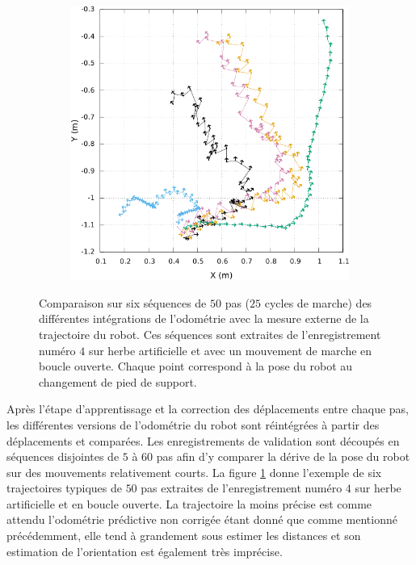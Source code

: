 \begin{figure}[htbp]
\begin{subfigure}{0.29\paperwidth}
    \end{subfigure}
    \begin{subfigure}{0.29\paperwidth}
        \centering
        \includegraphics[type=pdf,ext=.pdf,read=.pdf,width=1.0\linewidth]{../plot/OdometryLWPR/grass_open_traj6_pose}
    \end{subfigure}
    \caption{\label{fig:odometry_lwpr_trajs} 
        Comparaison sur six séquences de $50$ pas ($25$ cycles de marche) des différentes intégrations
        de l'odométrie avec la mesure externe de la trajectoire du robot.
        Ces séquences sont extraites de l'enregistrement numéro $4$ sur herbe artificielle et 
        avec un mouvement de marche en boucle ouverte. 
        Chaque point correspond à la pose du robot au changement de pied de support.
    }
\end{figure}

Après l'étape d'apprentissage et la correction des déplacements entre chaque pas, les différentes 
versions de l'odométrie du robot sont réintégrées à partir des déplacements et comparées.
Les enregistrements de validation sont découpés en séquences disjointes de $5$ à $60$ pas afin
d'y comparer la dérive de la pose du robot sur des mouvements relativement courts.
La figure \ref{fig:odometry_lwpr_trajs} donne l'exemple de six trajectoires typiques de $50$ pas
extraites de l'enregistrement numéro $4$ sur herbe artificielle et en boucle ouverte.
La trajectoire la moins précise est comme attendu l'odométrie prédictive non corrigée
étant donné que comme mentionné précédemment, elle tend à grandement sous estimer 
les distances et son estimation de l'orientation est également très imprécise.\\

